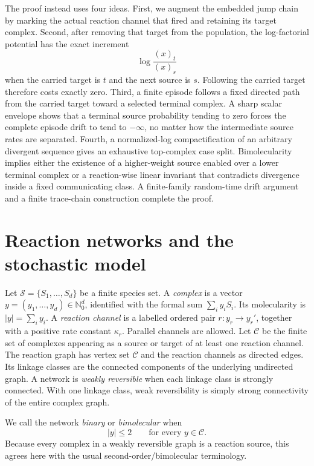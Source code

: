 The proof instead uses four ideas.  First, we augment the embedded jump chain
by marking the actual reaction channel that fired and retaining its target
complex.  Second, after removing that target from the population, the
log-factorial potential has the exact increment
\[
  \log\frac{(x)_t}{(x)_s}
\]
when the carried target is \(t\) and the next source is \(s\).  Following the
carried target therefore costs exactly zero.  Third, a finite episode follows
a fixed directed path from the carried target toward a selected terminal
complex.  A sharp scalar envelope shows that a terminal source probability
tending to zero forces the complete episode drift to tend to \(-\infty\), no
matter how the intermediate source rates are separated.  Fourth, a
normalized-log compactification of an arbitrary divergent sequence gives an
exhaustive top-complex case split.  Bimolecularity implies either the
existence of a higher-weight source enabled over a lower terminal complex or
a reaction-wise linear invariant that contradicts divergence inside a fixed
communicating class.  A finite-family random-time drift argument and a finite
trace-chain construction complete the proof.

\section{Reaction networks and the stochastic model}\label{sec:model}

Let \(\mathcal S=\{S_1,\dots,S_d\}\) be a finite species set.  A
\emph{complex} is a vector \(y=(y_1,\dots,y_d)\in\mathbb N_0^d\), identified
with the formal sum \(\sum_i y_iS_i\).  Its molecularity is
\(|y|=\sum_i y_i\).  A \emph{reaction channel} is a labelled ordered pair
\(r:y_r\to y_r'\), together with a positive rate constant \(\kappa_r\).
Parallel channels are allowed.  Let \(\mathcal C\) be the finite set of
complexes appearing as a source or target of at least one reaction channel.
The reaction graph has vertex set \(\mathcal C\) and the reaction channels as
directed edges.  Its linkage classes
are the connected components of the underlying undirected graph.  A network
is \emph{weakly reversible} when each linkage class is strongly connected.
With one linkage class, weak reversibility is simply strong connectivity of
the entire complex graph.

We call the network \emph{binary} or \emph{bimolecular} when
\begin{equation}\label{eq:binary}
  |y|\le2\qquad\text{for every }y\in\mathcal C.
\end{equation}
Because every complex in a weakly reversible graph is a reaction source, this
agrees here with the usual second-order/bimolecular terminology.

